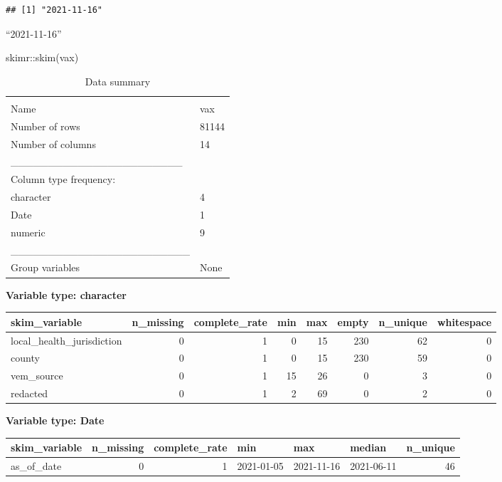 \documentclass[
]{article}
\newenvironment{Shaded}{\begin{snugshade}}{\end{snugshade}}
\newcommand{\FunctionTok}[1]{\textcolor[rgb]{0.00,0.00,0.00}{#1}}
\newcommand{\NormalTok}[1]{#1}
\newcommand{\SpecialCharTok}[1]{\textcolor[rgb]{0.00,0.00,0.00}{#1}}
\begin{document}
\begin{verbatim}
## [1] "2021-11-16"
\end{verbatim}

``2021-11-16''

\begin{Shaded}
\begin{Highlighting}[]
\NormalTok{skimr}\SpecialCharTok{::}\FunctionTok{skim}\NormalTok{(vax)}
\end{Highlighting}
\end{Shaded}

\begin{longtable}[]{@{}ll@{}}
\caption{Data summary}\tabularnewline
\toprule
& \\
\midrule
\endfirsthead
\toprule
& \\
\midrule
\endhead
Name & vax \\
Number of rows & 81144 \\
Number of columns & 14 \\
\_\_\_\_\_\_\_\_\_\_\_\_\_\_\_\_\_\_\_\_\_\_\_ & \\
Column type frequency: & \\
character & 4 \\
Date & 1 \\
numeric & 9 \\
\_\_\_\_\_\_\_\_\_\_\_\_\_\_\_\_\_\_\_\_\_\_\_\_ & \\
Group variables & None \\
\bottomrule
\end{longtable}

\textbf{Variable type: character}

\begin{longtable}[]{@{}lrrrrrrr@{}}
\toprule
skim\_variable & n\_missing & complete\_rate & min & max & empty &
n\_unique & whitespace \\
\midrule
\endhead
local\_health\_jurisdiction & 0 & 1 & 0 & 15 & 230 & 62 & 0 \\
county & 0 & 1 & 0 & 15 & 230 & 59 & 0 \\
vem\_source & 0 & 1 & 15 & 26 & 0 & 3 & 0 \\
redacted & 0 & 1 & 2 & 69 & 0 & 2 & 0 \\
\bottomrule
\end{longtable}

\textbf{Variable type: Date}

\begin{longtable}[]{@{}lrrlllr@{}}
\toprule
skim\_variable & n\_missing & complete\_rate & min & max & median &
n\_unique \\
\midrule
\endhead
as\_of\_date & 0 & 1 & 2021-01-05 & 2021-11-16 & 2021-06-11 & 46 \\
\bottomrule
\end{longtable}
\end{document}
